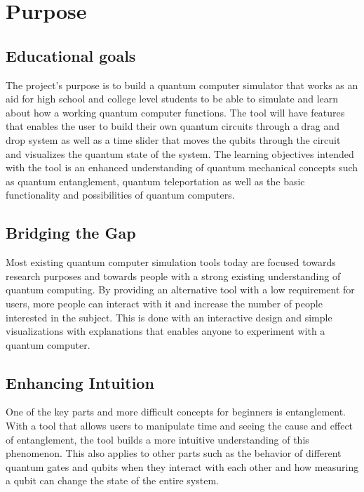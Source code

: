 \section{Purpose}

\subsection{Educational goals}
The project's purpose is to build a quantum computer simulator that works as an aid for high school and college level students to be able to simulate and learn about how a working quantum computer functions. The tool will have features that enables the user to build their own quantum circuits through a drag and drop system as well as a time slider that moves the qubits through the circuit and visualizes the quantum state of the system. The learning objectives intended with the tool is an enhanced understanding of quantum mechanical concepts such as quantum entanglement, quantum teleportation as well as the basic functionality and possibilities of quantum computers.

\subsection{Bridging the Gap}
Most existing quantum computer simulation tools today are focused towards research purposes and towards people with a strong existing understanding of quantum computing. 
By providing an alternative tool with a low requirement for users, more people can interact with it and increase the number of people interested in the subject. This is done with an interactive design and simple visualizations with explanations that enables anyone to experiment with a quantum computer.

\subsection{Enhancing Intuition}
One of the key parts and more difficult concepts for beginners is entanglement. With a tool that allows users to manipulate  time and seeing the cause and effect of entanglement, the tool builds a more intuitive understanding of this phenomenon. This also applies to other parts such as the behavior of different quantum gates and qubits when they interact with each other and how measuring a qubit can change the state of the entire system.
